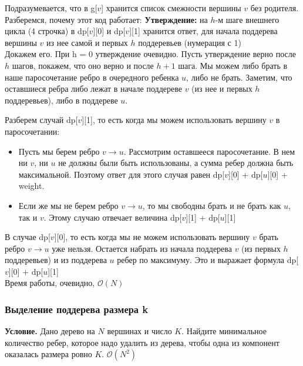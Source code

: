 \documentclass[a4paper,12pt]{article}
\begin{document}
	  Подразумевается, что в g[$v$] хранится список смежности вершины
      $v$ без родителя.\\
      
      Разберемся, почему этот код работает:
      \textbf{Утверждение:} на $h$-м шаге внешнего цикла (4 строчка) 
      в dp[$v$][0] и dp[$v$][1] хранится ответ, для начала поддерева 
      вершины $v$ из нее самой и первых $h$ поддеревьев (нумерация с 1)
      \\
      
      Докажем его. При h = 0 утверждение очевидно. Пусть утверждение верно 
      после $h$ шагов, покажем, что оно верно и после $h + 1$ шага. Мы можем
      либо брать в наше паросочетание ребро в очередного ребенка $u$, либо не
      брать. Заметим, что оставшиеся ребра либо лежат в начале поддереве $v$ 
      (из нее и первых $h$ поддеревьев), либо в поддереве $u$.
      
      Разберем случай dp[$v$][1], то есть когда мы можем использовать 
      вершину $v$ в паросочетании:
      \begin{itemize}
          \item Пусть мы берем ребро $v \rightarrow u$. Рассмотрим оставшееся
          паросочетание. В нем ни $v$, ни $u$ не должны были быть использованы,
          а сумма ребер должна быть максимальной. Поэтому ответ для этого случая
          равен dp[$v$][0] + dp[$u$][0] + weight. 
      
          \item Если же мы не берем ребро $v \rightarrow u$, то мы свободны 
          брать и не брать как $u$, так и $v$. Этому случаю отвечает величина
          dp[$v$][1] + dp[$u$][1]
      \end{itemize}
      
      В случае dp[$v$][0], то есть когда мы не можем использовать вершину $v$
      брать ребро $v \rightarrow u$ уже нельзя. Остается набрать из начала 
      поддерева $v$ (из первых $h$ поддеревьев) и из поддерева $u$ ребер 
      по максимуму. Это и выражает формула dp[$v$][0] + dp[$u$][1]
      \\
      
      Время работы, очевидно, $\mathcal{O}(N)$

     
      \subsubsection{Выделение поддерева размера k}
      
      \textbf{Условие.} Дано дерево на $N$ вершинах и число $K$. 
      Найдите минимальное количество ребер, которое надо удалить из дерева, 
      чтобы одна из компонент оказалась размера ровно $K$. $\mathcal{O}(N^2)$
      
\end{document}
